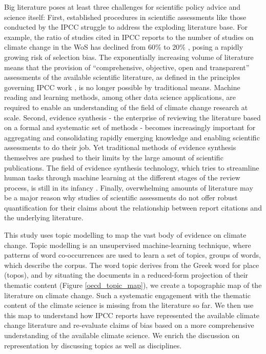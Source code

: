 \documentclass{article}
\begin{document}
\begin{linenumbers}
		
		Big literature poses at least three challenges for scientific policy advice and science itself: First, established procedures in scientific assessments like those conducted by the IPCC struggle to address the exploding literature base. For example, the ratio of studies cited in IPCC reports to the number of studies on climate change in the WoS has declined from 60\% to 20\%  \cite{Minx2017l}, posing a rapidly growing risk of selection bias. The exponentially increasing volume of literature means that the provision of ``comprehensive, objective, open and transparent'' assessments of the available scientific literature, as defined in the principles governing IPCC work \cite{IPCC2013}, is no longer possible by traditional means. 
		Machine reading and learning methods, among other data science applications, are required to enable an understanding of the field of climate change research at scale. 
		Second, evidence synthesis - the enterprise of reviewing the literature based on a formal and systematic set of methods \cite{Chalmers2002} - becomes increasingly important for aggregating and consolidating rapidly emerging knowledge and enabling scientific assessments to do their job. 
		Yet traditional methods of evidence synthesis themselves are pushed to their limits by the large amount of scientific publications. The field of evidence synthesis technology, which tries to streamline human tasks through machine learning at the different stages of the review process, is still in its infancy \cite{Beller2018}. Finally, overwhelming amounts of literature may be a major reason why studies of scientific assessments \cite{Bjurstroem2011} do not offer robust quantification for their claims about the relationship between report citations and the underlying literature. 
		
		This study uses topic modelling \cite{Blei2010} to map the vast body of evidence on climate change. Topic modelling is an unsupervised machine-learning technique, where patterns of word co-occurrences are used to learn a set of topics, groups of words, which describe the corpus. 
		The word topic derives from the Greek word for place (topos), and by situating the documents in a reduced-form projection of their thematic content (Figure \ref{oecd_topic_map}), we create a topographic map of the literature on climate change. Such a systematic engagement with the thematic content of the climate science is missing from the literature so far. 
		We then use this map to understand how IPCC reports have represented the available climate change literature and re-evaluate claims of bias based on a more comprehensive understanding of the available climate science. 
		We enrich the discussion on representation by discussing topics as well as disciplines. 
		

\end{linenumbers}
\end{document}
